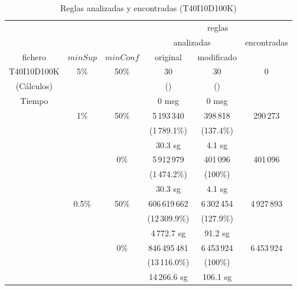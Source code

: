 \begin{table}[htb]
   \scriptsize
   \begin{center}
      \begin{tabular}{cccccc} \hline
                     &          &        & \multicolumn{3}{c}{reglas} \\ \cline{4-6}
                     &          &        & \multicolumn{2}{c}{analizadas} & encontradas \\ \cline{4-5}
         fichero     & $minSup$ & $minConf$ & original   & modificado  & \\ \cline{1-1}\cline{2-2}\cline{3-3} \cline{4-4}\cline{5-5} \cline{6-6}
         T40I10D100K & 5\%      & 50\%   & 30            & 30          & 0 \\                      %
         (Cálculos)  &          &        & ()            & ()          & \\
         Tiempo      &          &        & 0 msg         & 0 msg       & \\
                     & 1\%      & 50\%   & 5\,193\,340   & 398\,818    & 290\,273 \\
                     &          &        & (1\,789.1\%)  & (137.4\%)   & \\
                     &          &        & 30.3 sg       & 4.1 sg      & \\
                     &          & 0\%    & 5\,912\,979   & 401\,096    & 401\,096 \\
                     &          &        & (1\,474.2\%)  & (100\%)     & \\
                     &          &        & 30.3 sg       & 4.1 sg      & \\
                     & 0.5\%    & 50\%   & 606\,619\,662 & 6\,302\,454 & 4\,927\,893 \\
                     &          &        & (12\,309.9\%) & (127.9\%)   & \\
                     &          &        & 4\,772.7 sg   & 91.2 sg     & \\
                     &          & 0\%    & 846\,495\,481 & 6\,453\,924 & 6\,453\,924 \\
                     &          &        & (13\,116.0\%) & (100\%)     & \\
                     &          &        & 14\,266.6 sg  & 106.1 sg    & \\ \hline
      \end{tabular}
   \end{center}
   \caption{Reglas analizadas y encontradas (T40I10D100K)}
   \label{tab:T40I10D100K}
\end{table}




